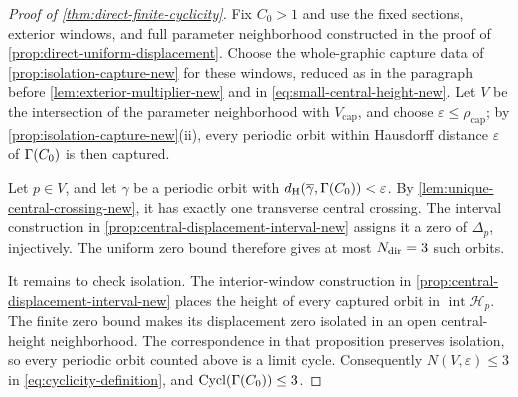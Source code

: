 \begin{proof}[Proof of \cref{thm:direct-finite-cyclicity}]
Fix \(C_0>1\) and use the fixed sections, exterior windows,
and full parameter neighborhood constructed in the proof of
\cref{prop:direct-uniform-displacement}. Choose the
whole-graphic capture data of
\cref{prop:isolation-capture-new} for these windows, reduced as in
the paragraph before \cref{lem:exterior-multiplier-new} and in
\eqref{eq:small-central-height-new}.
Let \(V\) be the intersection of the parameter neighborhood
with \(V_{\mathrm{cap}}\), and choose
\(\varepsilon\le\rho_{\mathrm{cap}}\); by
\cref{prop:isolation-capture-new}(ii), every periodic orbit within
Hausdorff distance \(\varepsilon\) of \(\Gamma(C_0)\) is then captured.

Let \(p\in V\), and let \(\gamma\) be a periodic orbit with
\(d_{\mathrm H}(\overline\gamma,\Gamma(C_0))<\varepsilon\). By
\cref{lem:unique-central-crossing-new}, it has exactly one transverse
central crossing. The interval construction in
\cref{prop:central-displacement-interval-new} assigns it a zero of
\(\Delta_p\), injectively. The uniform zero bound therefore gives
at most \(N_{\rm dir}=3\) such orbits.

It remains to check isolation. The interior-window construction in
\cref{prop:central-displacement-interval-new} places the height of
every captured orbit in \(\operatorname{int}\mathcal H_p\).
The finite zero bound makes its displacement zero isolated in an
open central-height neighborhood. The correspondence in that
proposition preserves isolation, so every periodic orbit counted
above is a limit cycle.
Consequently \(N(V,\varepsilon)\le3\) in
\eqref{eq:cyclicity-definition}, and \(\operatorname{Cycl}(\Gamma(C_0))\le3\).
\end{proof}
